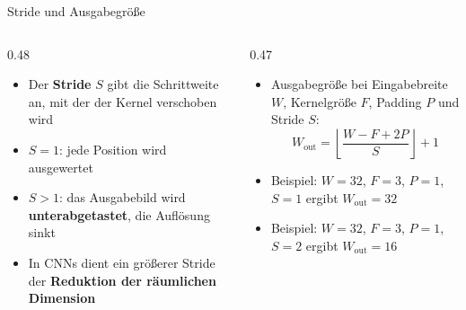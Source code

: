 {%
\begin{frame}{Stride und Ausgabegröße}
\begin{columns}
\begin{column}{0.48\textwidth}
\begin{itemize}
    \item Der \textbf{Stride} $S$ gibt die Schrittweite an, mit der der Kernel verschoben wird
    \item $S = 1$: jede Position wird ausgewertet
    \item $S > 1$: das Ausgabebild wird \textbf{unterabgetastet}, die Auflösung sinkt
    \item In CNNs dient ein größerer Stride der \textbf{Reduktion der räumlichen Dimension}
\end{itemize}
\end{column}
\begin{column}{0.47\textwidth}
\begin{itemize}
    \item Ausgabegröße bei Eingabebreite $W$, Kernelgröße $F$, Padding $P$ und Stride $S$:
    \[
        W_{\text{out}} = \left\lfloor \frac{W - F + 2P}{S} \right\rfloor + 1
    \]
    \item Beispiel: $W = 32$, $F = 3$, $P = 1$, $S = 1$ ergibt $W_{\text{out}} = 32$
    \item Beispiel: $W = 32$, $F = 3$, $P = 1$, $S = 2$ ergibt $W_{\text{out}} = 16$
\end{itemize}
\end{column}
\end{columns}
\end{frame}

}

